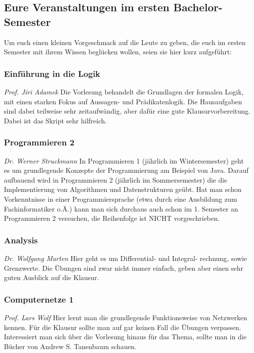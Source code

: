 \begin{multicols}{2}
\subsection{Eure Veranstaltungen im ersten Bachelor-Semester}
	Um euch einen kleinen Vorgeschmack auf die Leute zu geben, die euch im ersten Semester mit ihrem Wissen beglücken wollen, seien sie hier kurz aufgeführt:

\subsubsection{Einführung in die Logik}
	\textit{Prof. Jiri Adamek}
	Die Vorlesung behandelt die Grundlagen der formalen Logik, mit einen starken Fokus auf Aussagen- und Prädikatenlogik. Die Hausaufgaben sind dabei teilweise sehr zeitaufwändig, aber dafür eine gute Klausurvorbereitung. Dabei ist das Skript sehr hilfreich.

\subsubsection{Programmieren 2}
	\textit{Dr. Werner Struckmann}
	In Programmieren 1 (jährlich im Wintersemester) geht es um grundlegende Konzepte der Programmierung am Beispiel von Java. Darauf aufbauend wird in Programmieren 2 (jährlich im Sommersemester) die die Implementierung von Algorithmen und Datenstrukturen geübt. Hat man schon Vorkenntnisse in einer Programmiersprache (etwa durch eine Ausbildung zum Fachinformatiker o.Ä.) kann man sich durchaus auch schon im 1. Semester an Programmieren 2 versuchen, die Reihenfolge ist NICHT vorgeschrieben.

\subsubsection{Analysis}
	\textit{Dr. Wolfgang Marten}
	Hier geht es um Differential- und Integral- rechnung, sowie Grenzwerte. Die Übungen sind zwar nicht immer einfach, geben aber einen sehr guten Ausblick auf die Klausur.

\subsubsection{Computernetze 1}
	\textit{Prof. Lars Wolf}
	Hier lernt man die grundlegende Funktionsweise von Netzwerken kennen. Für die Klausur sollte man auf gar keinen Fall die Übungen verpassen. Interessiert man sich über die Vorlesung hinaus für das Thema, sollte man in die Bücher von Andrew S. Tanenbaum schauen.


\end{multicols}
